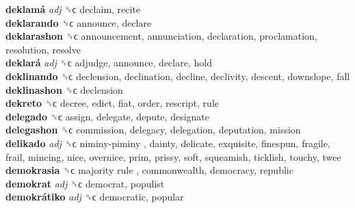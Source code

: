 \textbf{deklamá} \emph{adj}  ␝ϲ  declaim, recite  \\
\textbf{deklarando} ␝ϲ  announce, declare  \\
\textbf{deklarashon} ␝ϲ  announcement, annunciation, declaration, proclamation, resolution, resolve  \\
\textbf{deklará} \emph{adj}  ␝ϲ  adjudge, announce, declare, hold  \\
\textbf{deklinando} ␝ϲ  declension, declination, decline, declivity, descent, downslope, fall  \\
\textbf{deklinashon} ␝ϲ  declension  \\
\textbf{dekreto} ␝ϲ  decree, edict, fiat, order, rescript, rule  \\
\textbf{delegado} ␝ϲ  assign, delegate, depute, designate  \\
\textbf{delegashon} ␝ϲ  commission, delegacy, delegation, deputation, mission  \\
\textbf{delikado} \emph{adj}  ␝ϲ   niminy-piminy , dainty, delicate, exquisite, finespun, fragile, frail, mincing, nice, overnice, prim, prissy, soft, squeamish, ticklish, touchy, twee  \\
\textbf{demokrasia} ␝ϲ   majority rule , commonwealth, democracy, republic  \\
\textbf{demokrat} \emph{adj}  ␝ϲ  democrat, populist  \\
\textbf{demokrátiko} \emph{adj}  ␝ϲ  democratic, popular  \\
